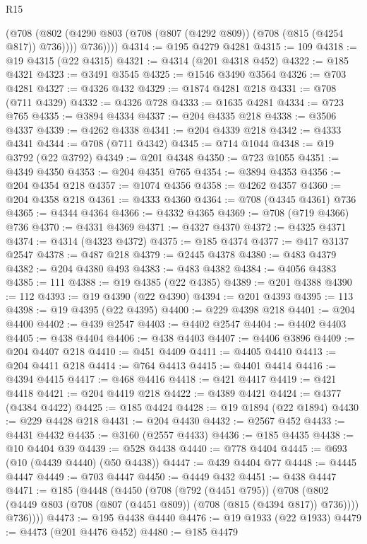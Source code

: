 \begin{lexlean}{R15}
\begin{coremodule}
{{{{{{{{{{{          (@708
            (@802 (@4290 @803 (@708 (@807 (@4292 @809)) (@708 (@815 (@4254 @817)) @736))))
            @736))))
@4314 := @195 @4279 @4281
@4315 := 109
@4318 := @19 @4315 (@22 @4315)
@4321 := @4314 (@201 @4318 @452)
@4322 := @185 @4321
@4323 := @3491 @3545
@4325 := @1546 @3490 @3564
@4326 := @703 @4281
@4327 := @4326 @432
@4329 := @1874 @4281 @218
@4331 := @708 (@711 @4329)
@4332 := @4326 @728
@4333 := @1635 @4281
@4334 := @723 @765
@4335 := @3894 @4334
@4337 := @204 @4335 @218
@4338 := @3506 @4337
@4339 := @4262 @4338
@4341 := @204 @4339 @218
@4342 := @4333 @4341
@4344 := @708 (@711 @4342)
@4345 := @714 @1044
@4348 := @19 @3792 (@22 @3792)
@4349 := @201 @4348
@4350 := @723 @1055
@4351 := @4349 @4350
@4353 := @204 @4351 @765
@4354 := @3894 @4353
@4356 := @204 @4354 @218
@4357 := @1074 @4356
@4358 := @4262 @4357
@4360 := @204 @4358 @218
@4361 := @4333 @4360
@4364 := @708 (@4345 @4361) @736
@4365 := @4344 @4364
@4366 := @4332 @4365
@4369 := @708 (@719 @4366) @736
@4370 := @4331 @4369
@4371 := @4327 @4370
@4372 := @4325 @4371
@4374 := @4314 (@4323 @4372)
@4375 := @185 @4374
@4377 := @417 @3137 @2547
@4378 := @487 @218
@4379 := @2445 @4378
@4380 := @483 @4379
@4382 := @204 @4380 @493
@4383 := @483 @4382
@4384 := @4056 @4383
@4385 := 111
@4388 := @19 @4385 (@22 @4385)
@4389 := @201 @4388
@4390 := 112
@4393 := @19 @4390 (@22 @4390)
@4394 := @201 @4393
@4395 := 113
@4398 := @19 @4395 (@22 @4395)
@4400 := @229 @4398 @218
@4401 := @204 @4400
@4402 := @439 @2547
@4403 := @4402 @2547
@4404 := @4402 @4403
@4405 := @438 @4404
@4406 := @438 @4403
@4407 := @4406 @3896
@4409 := @204 @4407 @218
@4410 := @451 @4409
@4411 := @4405 @4410
@4413 := @204 @4411 @218
@4414 := @764 @4413
@4415 := @4401 @4414
@4416 := @4394 @4415
@4417 := @468 @4416
@4418 := @421 @4417
@4419 := @421 @4418
@4421 := @204 @4419 @218
@4422 := @4389 @4421
@4424 := @4377 (@4384 @4422)
@4425 := @185 @4424
@4428 := @19 @1894 (@22 @1894)
@4430 := @229 @4428 @218
@4431 := @204 @4430
@4432 := @2567 @452
@4433 := @4431 @4432
@4435 := @3160 (@2557 @4433)
@4436 := @185 @4435
@4438 := @10 @4404 @39
@4439 := @528 @4438
@4440 := @778 @4404
@4445 := @693 (@10 (@4439 @4440) (@50 @4438))
@4447 := @439 @4404 @77
@4448 := @4445 @4447
@4449 := @703 @4447
@4450 := @4449 @432
@4451 := @438 @4447
@4471 := @185
    (@4448
      (@4450
        (@708
          (@792 (@4451 @795))
          (@708
            (@802 (@4449 @803 (@708 (@807 (@4451 @809)) (@708 (@815 (@4394 @817)) @736))))
            @736))))
@4473 := @195 @4438 @4440
@4476 := @19 @1933 (@22 @1933)
@4479 := @4473 (@201 @4476 @452)
@4480 := @185 @4479
}}}}}}}}}}}
\end{coremodule}
\end{lexlean}
